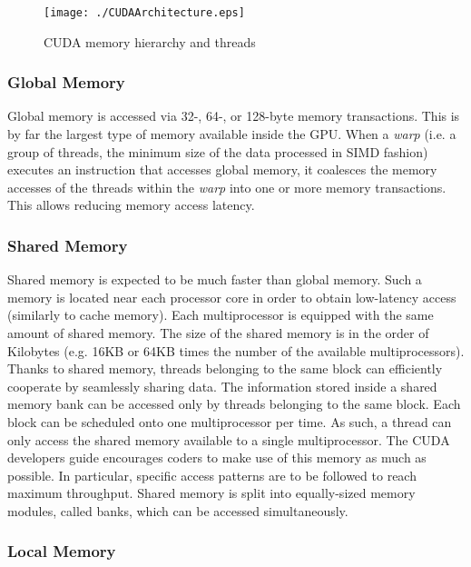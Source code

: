 \documentclass[11pt,onecolumn,letterpaper]{IEEEtran}
\begin{document}
\begin{wrapfigure}{r}{0.5\textwidth}
 \centering
 \texttt{[image: ./CUDAArchitecture.eps]}
 \caption{CUDA memory hierarchy and threads}
 \label{fig:CUDA_Architecture}
\end{wrapfigure}

\subsubsection{Global Memory}

Global memory is accessed via 32-, 64-, or 128-byte memory transactions. 
This is by far the largest type of memory available inside the GPU. 
When a \textit{warp} (i.e. a group of threads, the minimum size of the data processed in SIMD fashion) executes an instruction that accesses global memory,
it coalesces\cite{coalescing} the memory accesses of the threads within the \textit{warp} into one or more memory transactions. 
This allows reducing memory access latency.

\subsubsection{Shared Memory}

Shared memory is expected to be much faster than global memory. 
Such a memory is located near each processor core in order to obtain low-latency access (similarly to cache memory).
Each multiprocessor is equipped with the same amount of shared memory.
The size of the shared memory is in the order of Kilobytes (e.g. 16KB or 64KB times the number
of the available multiprocessors).
Thanks to shared memory, threads belonging to the same block can efficiently cooperate by seamlessly sharing data.
The information stored inside a shared memory bank can be accessed only by threads belonging to the same block. 
Each block can be scheduled onto one multiprocessor per time. 
As such, a thread can only access the shared memory available to a single multiprocessor.
The CUDA developers guide \cite{cudadevguide} encourages coders to make use of this memory as much as possible.
In particular, specific access patterns are to be followed to reach maximum throughput.
Shared memory is split into equally-sized memory modules, called banks, which can be accessed simultaneously.

\subsubsection{Local Memory}
\end{document}
